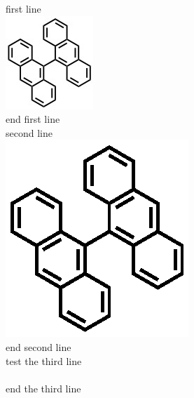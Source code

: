 \documentclass{article}
\begin{document}
\noindent first line \\ 
\includegraphics{untitled.jpg} \\
end first line \\

\noindent second line \\
\includegraphics{untitled.eps} \\
end second line \\ 

\noindent test the third line \\
 \\
end the third line
\end{document}
